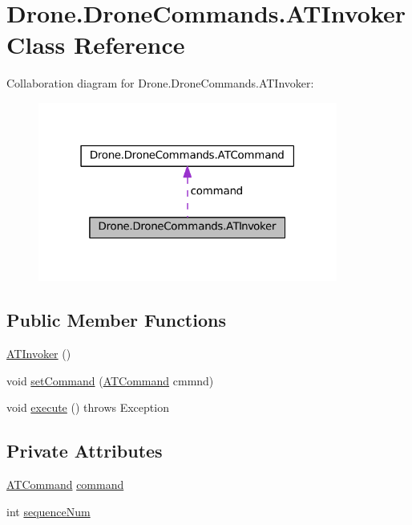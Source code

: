 \hypertarget{class_drone_1_1_drone_commands_1_1_a_t_invoker}{}\section{Drone.\+Drone\+Commands.\+A\+T\+Invoker Class Reference}
\label{class_drone_1_1_drone_commands_1_1_a_t_invoker}


Collaboration diagram for Drone.\+Drone\+Commands.\+A\+T\+Invoker\+:\nopagebreak
\begin{figure}[H]
\begin{center}
\leavevmode
\includegraphics[width=279pt]{class_drone_1_1_drone_commands_1_1_a_t_invoker__coll__graph}
\end{center}
\end{figure}
\subsection*{Public Member Functions}
\begin{DoxyCompactItemize}
\item 
\hyperlink{class_drone_1_1_drone_commands_1_1_a_t_invoker_acb72cb6d2cccdb9942c0bf6b9f1545a8}{A\+T\+Invoker} ()
\item 
void \hyperlink{class_drone_1_1_drone_commands_1_1_a_t_invoker_af32f17db8eb3a66a6f3d05ec7e00ef0b}{set\+Command} (\hyperlink{interface_drone_1_1_drone_commands_1_1_a_t_command}{A\+T\+Command} cmmnd)
\item 
void \hyperlink{class_drone_1_1_drone_commands_1_1_a_t_invoker_a0dfcc8b67f8642820b66411954452d06}{execute} ()  throws Exception 	
\end{DoxyCompactItemize}
\subsection*{Private Attributes}
\begin{DoxyCompactItemize}
\item 
\hyperlink{interface_drone_1_1_drone_commands_1_1_a_t_command}{A\+T\+Command} \hyperlink{class_drone_1_1_drone_commands_1_1_a_t_invoker_a8d5969ed00c3e025b91905bf34bb60ed}{command}
\item 
int \hyperlink{class_drone_1_1_drone_commands_1_1_a_t_invoker_a3f43a20e12de8cc4f0c652f3c7a3f977}{sequence\+Num}
\end{DoxyCompactItemize}


